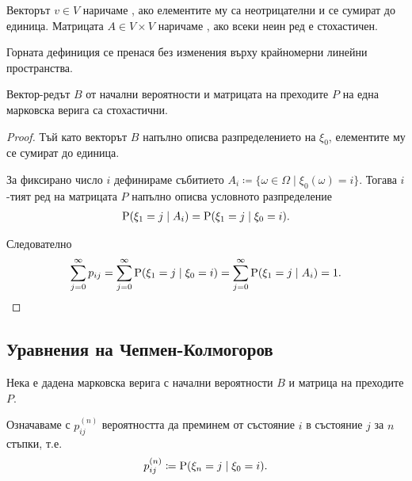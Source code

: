 \documentclass[numbers=endperiod, bibliography=totocnumbered]{scrartcl}
\begin{document}
\begin{definition}
  Векторът \( v \in V \) наричаме , ако елементите му са неотрицателни и се сумират до единица. Матрицата \( A \in V \times V \) наричаме , ако всеки неин ред е стохастичен.
\end{definition}

\begin{note}
  Горната дефиниция се пренася без изменения върху крайномерни линейни пространства.
\end{note}

\begin{proposition}
  Вектор-редът \( B \) от начални вероятности и матрицата на преходите \( P \) на една марковска верига са стохастични.
\end{proposition}
\begin{proof}
  Тъй като векторът \( B \) напълно описва разпределението на \( \xi_0 \), елементите му се сумират до единица.

  За фиксирано число \( i \) дефинираме събитието \( A_i \coloneqq \{ \omega \in \Omega \mid \xi_0(\omega) = i \} \). Тогава \( i \)-тият ред на матрицата \( P \) напълно описва условното разпределение
  \begin{align*}
    \operatorname{P}(\xi_1 = j \mid A_i)
    =
    \operatorname{P}(\xi_1 = j \mid \xi_0 = i).
  \end{align*}

  Следователно
  \begin{align*}
    \sum_{j=0}^\infty p_{ij}
    =
    \sum_{j=0}^\infty \operatorname{P}(\xi_1 = j \mid \xi_0 = i)
    =
    \sum_{j=0}^\infty \operatorname{P}(\xi_1 = j \mid A_i)
    =
    1.
  \end{align*}
\end{proof}

\subsection{Уравнения на Чепмен-Колмогоров}

Нека е дадена марковска верига с начални вероятности \( B \) и матрица на преходите \( P \).

Означаваме с \( p^{(n)}_{ij} \) вероятността да преминем от състояние \( i \) в състояние \( j \) за \( n \) стъпки, т.е.
\begin{align*}
  p^{(n)}_{ij} \coloneqq \operatorname{P}(\xi_n = j \mid \xi_0 = i).
\end{align*}
\end{document}
